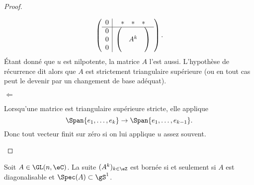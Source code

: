 \begin{proof}
\begin{subproof}
\begin{equation}
               \begin{pmatrix}
                       \begin{array}[]{c|c}
                           0&\begin{matrix} 
                               * &   *    &   *    
                           \end{matrix}\\
                           \hline
                           \begin{matrix}
                               0 \\ 
                               0 \\ 
                               0 
                           \end{matrix}&
                           \begin{pmatrix}
                                &       &       \\
                                &   A^k    &       \\
                                &       &   
                           \end{pmatrix}
                       \end{array}
               \end{pmatrix}.
           \end{equation}
           Étant donné que \( u\) est nilpotente, la matrice \( A\) l'est aussi. L'hypothèse de récurrence dit alors que \( A\) est strictement triangulaire supérieure (ou en tout cas peut le devenir par un changement de base adéquat).

       \item[\( \Leftarrow\)]

            Lorsqu'une matrice est triangulaire supérieure stricte, elle applique
            \begin{equation}
                \Span\{ e_1,\ldots, e_k \}\to\Span\{ e_1,\ldots, e_{k-1} \}.
            \end{equation}
            Donc tout vecteur finit sur zéro si on lui applique \( u\) assez souvent.
    \end{subproof}
\end{proof}



\begin{proposition}
    Soit \( A\in\GL(n,\eC)\). La suite \( (A^k)_{k\in \eZ}\) est bornée si et seulement si \( A\) est diagonalisable et \( \Spec(A)\subset \gS^1\).
\end{proposition}

